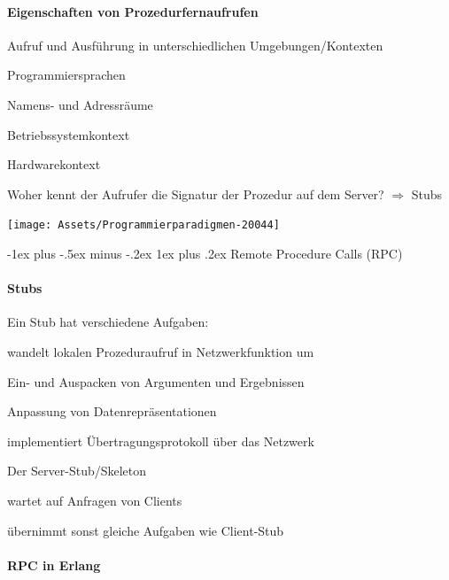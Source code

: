 \documentclass[10pt]{article}
\makeatletter
\renewcommand{\subsubsection}{\@startsection{subsubsection}{3}{0mm}%
                                {-1ex plus -.5ex minus -.2ex}%
                                {1ex plus .2ex}%
                                {\normalfont\small\bfseries}}
\makeatother
\begin{document}
  \paragraph{Eigenschaften von Prozedurfernaufrufen}
  
  Aufruf und Ausführung in unterschiedlichen Umgebungen/Kontexten
  \begin{itemize*}
    \item Programmiersprachen
    \item Namens- und Adressräume
    \item Betriebssystemkontext
    \item Hardwarekontext
  \end{itemize*}
  Woher kennt der Aufrufer die Signatur der Prozedur auf dem Server? $\Rightarrow$ \color{orange} Stubs \color{black}
\begin{center}
  \centering
  \texttt{[image: Assets/Programmierparadigmen-20044]}
\end{center}

\subsubsection{Remote Procedure Calls (RPC)}
\paragraph{Stubs}

Ein Stub hat verschiedene Aufgaben: 
\begin{itemize*}
  \item wandelt lokalen Prozeduraufruf in Netzwerkfunktion um
  \item Ein- und Auspacken von Argumenten und Ergebnissen
  \item Anpassung von Datenrepräsentationen
  \item implementiert Übertragungsprotokoll über das Netzwerk
\end{itemize*}
Der Server-Stub/Skeleton
\begin{itemize*}
  \item wartet auf Anfragen  von Clients
  \item übernimmt sonst gleiche Aufgaben wie Client-Stub
\end{itemize*}

\paragraph{RPC in Erlang}
\end{document}
